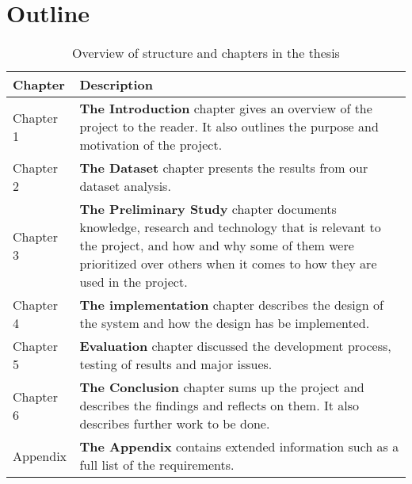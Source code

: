 \section{Outline}
\begin{table}[H]
  \centering
  \begin{tabular}{lp{11cm}}
  \toprule
    \textbf{Chapter}      & \textbf{Description} \\ 
  \midrule

    Chapter 1 & \textbf{The Introduction} chapter gives an overview of the
    project to the reader. It also outlines the purpose and motivation of the
    project.  \\[1.5ex]

    Chapter 2 & \textbf{The Dataset} chapter presents the results from our
    dataset analysis. \\[1.5ex]

    Chapter 3 & \textbf{The Preliminary Study} chapter documents knowledge,
    research and technology that is relevant to the project, and how and why
    some of them were prioritized over others when it comes to how they are
    used in the project. \\[1.5ex]

    Chapter 4 & \textbf{The implementation} chapter describes the design of the
    system and how the design has be implemented. \\[1.5ex]

    Chapter 5 & \textbf{Evaluation} chapter discussed the development process,
    testing of results and major issues. \\[1.5ex]

    Chapter 6 & \textbf{The Conclusion} chapter sums up the project and describes the
    findings and reflects on them. It also describes further work to be done.
    \\[1.5ex]

    Appendix & \textbf{The Appendix} contains extended information such as a
    full list of the requirements. \\

  \bottomrule
  \end{tabular}
  \caption{Overview of structure and chapters in the thesis}
  \label{table-reportstructure}
\end{table}
